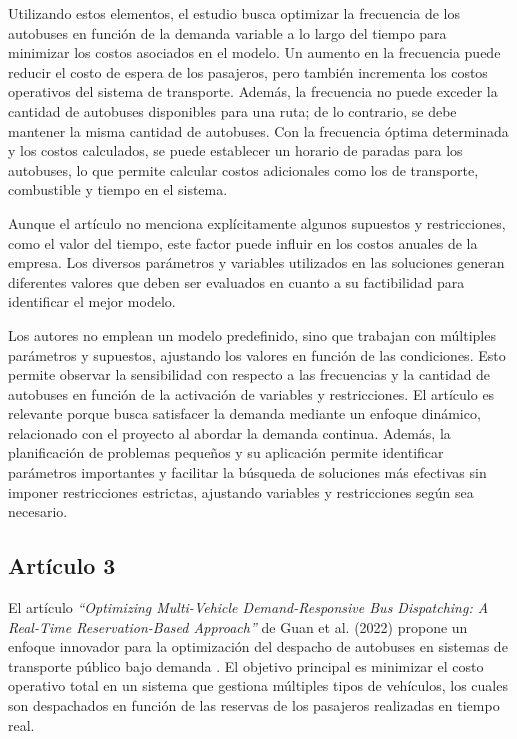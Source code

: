 \documentclass[preprint,11pt]{elsarticle}
\begin{document}
Utilizando estos elementos, el estudio busca optimizar la frecuencia de los autobuses en función de la demanda variable a lo largo del tiempo para minimizar los costos asociados en el modelo. Un aumento en la frecuencia puede reducir el costo de espera de los pasajeros, pero también incrementa los costos operativos del sistema de transporte. Además, la frecuencia no puede exceder la cantidad de autobuses disponibles para una ruta; de lo contrario, se debe mantener la misma cantidad de autobuses. Con la frecuencia óptima determinada y los costos calculados, se puede establecer un horario de paradas para los autobuses, lo que permite calcular costos adicionales como los de transporte, combustible y tiempo en el sistema.

Aunque el artículo no menciona explícitamente algunos supuestos y restricciones, como el valor del tiempo, este factor puede influir en los costos anuales de la empresa. Los diversos parámetros y variables utilizados en las soluciones generan diferentes valores que deben ser evaluados en cuanto a su factibilidad para identificar el mejor modelo.

Los autores no emplean un modelo predefinido, sino que trabajan con múltiples parámetros y supuestos, ajustando los valores en función de las condiciones. Esto permite observar la sensibilidad con respecto a las frecuencias y la cantidad de autobuses en función de la activación de variables y restricciones. El artículo es relevante porque busca satisfacer la demanda mediante un enfoque dinámico, relacionado con el proyecto al abordar la demanda continua. Además, la planificación de problemas pequeños y su aplicación permite identificar parámetros importantes y facilitar la búsqueda de soluciones más efectivas sin imponer restricciones estrictas, ajustando variables y restricciones según sea necesario.


\subsection*{Artículo 3}

El artículo \textit{“Optimizing Multi-Vehicle Demand-Responsive Bus Dispatching: A Real-Time Reservation-Based Approach”} de Guan et al. (2022) propone un enfoque innovador para la optimización del despacho de autobuses en sistemas de transporte público bajo demanda \parencite{guan2022}. El objetivo principal es minimizar el costo operativo total en un sistema que gestiona múltiples tipos de vehículos, los cuales son despachados en función de las reservas de los pasajeros realizadas en tiempo real.
\end{document}
